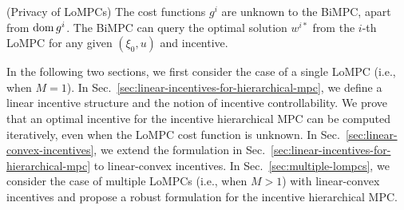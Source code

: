 \begin{assumption} (Privacy of LoMPCs)
\label{assum:privacy-of-lompc}
    The cost functions $g^i$ are unknown to the BiMPC, apart from $\operatorname{dom}{g^i}$.
    The BiMPC can query the optimal solution $w^{i*}$ from the $i$-th LoMPC for any given $(\xi_0, u)$ and incentive.
\end{assumption}

In the following two sections, we first consider the case of a single LoMPC (i.e., when $M = 1$).
In Sec.~\ref{sec:linear-incentives-for-hierarchical-mpc}, we define a linear incentive structure and the notion of incentive controllability.
We prove that an optimal incentive for the incentive hierarchical MPC can be computed iteratively, even when the LoMPC cost function is unknown.
In Sec.~\ref{sec:linear-convex-incentives}, we extend the formulation in Sec.~\ref{sec:linear-incentives-for-hierarchical-mpc} to linear-convex incentives.
In Sec.~\ref{sec:multiple-lompcs}, we consider the case of multiple LoMPCs (i.e., when $M > 1$) with linear-convex incentives and propose a robust formulation for the incentive hierarchical MPC.



